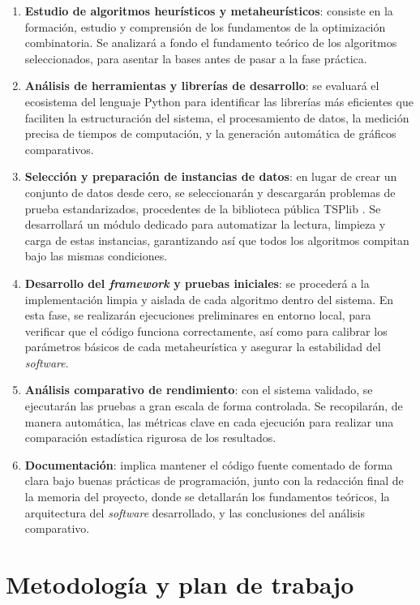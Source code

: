 \documentclass[11pt,a4paper,oneside]{article}
\begin{document}
\begin{enumerate}
  \item \textbf{Estudio de algoritmos heurísticos y metaheurísticos}: consiste en la formación, estudio y comprensión de los fundamentos
  de la optimización combinatoria. Se analizará a fondo el fundamento teórico de los algoritmos seleccionados, para asentar la bases 
  antes de pasar a la fase práctica.
  \item \textbf{Análisis de herramientas y librerías de desarrollo}: se evaluará el ecosistema del lenguaje Python para identificar las
   librerías más eficientes que faciliten la estructuración del sistema, el procesamiento de datos, la medición precisa de tiempos de
    computación, y la generación automática de gráficos comparativos.
  \item \textbf{Selección y preparación de instancias de datos}: en lugar de crear un conjunto de datos desde cero, se seleccionarán y
  descargarán problemas de prueba estandarizados, procedentes de la biblioteca pública TSPlib \cite{tsplib}. Se desarrollará un módulo dedicado para
  automatizar la lectura, limpieza y carga de estas instancias, garantizando así que todos los algoritmos compitan bajo las mismas 
  condiciones.
  \item \textbf{Desarrollo del \textit{framework} y pruebas iniciales}: se procederá a la implementación limpia y aislada de cada 
  algoritmo dentro del sistema. En esta fase, se realizarán ejecuciones preliminares en entorno local, para verificar que el código
  funciona correctamente, así como para calibrar los parámetros básicos de cada metaheurística y asegurar la estabilidad del
  \textit{software}.
  \item \textbf{Análisis comparativo de rendimiento}: con el sistema validado, se ejecutarán las pruebas a gran escala de forma 
  controlada. Se recopilarán, de manera automática, las métricas clave en cada ejecución para realizar una comparación estadística 
  rigurosa de los resultados.
  \item \textbf{Documentación}: implica mantener el código fuente comentado de forma clara bajo buenas prácticas de programación, junto  
  con la redacción final de la memoria del proyecto, donde se detallarán los fundamentos teóricos, la arquitectura del \textit{software}
  desarrollado, y las conclusiones del análisis comparativo.
\end{enumerate}

\section{Metodología y plan de trabajo}
\label{sec:metodologia-y-plan}
\end{document}
